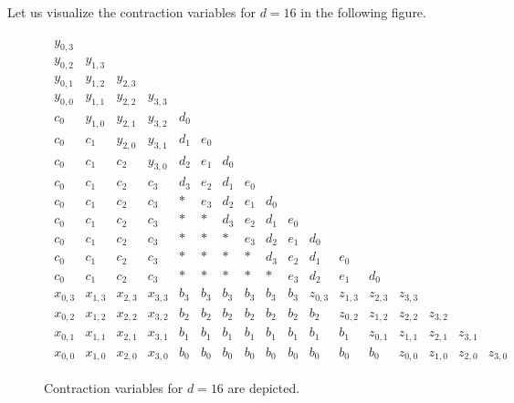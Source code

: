 Let us visualize the contraction variables for \( d = 16 \) in the following figure.

\begin{figure}[H]
    \begin{align*}
        \begin{array}{cccccccccccccccccccc}
            y_{0,3} & & & & & & & & & & & & \\
            y_{0,2} & y_{1,3} & & & & & & & & & & & \\
            y_{0,1} & y_{1,2} & y_{2,3} & & & & & & & & & & \\
            y_{0,0} & y_{1,1} & y_{2,2} & y_{3,3} & & & & & & & & & \\
            c_0 & y_{1,0} & y_{2,1} & y_{3,2} & d_0 & & & & & & & & \\
            c_0 & c_1 & y_{2,0} & y_{3,1} & d_1 & e_0 & & & & & & & \\
            c_0 & c_1 & c_2 & y_{3,0} & d_2 & e_1 & d_0 & & & & & & \\
            c_0 & c_1 & c_2 & c_3 & d_3 & e_2 & d_1 & e_0 & & & & & \\
            c_0 & c_1 & c_2 & c_3 &  *  & e_3 & d_2 & e_1 & d_0 & & & & \\
            c_0 & c_1 & c_2 & c_3 &  *  & * & d_3 & e_2 & d_1 & e_0 & & & \\
            c_0 & c_1 & c_2 & c_3 &  *  & * & * & e_3 & d_2 & e_1 & d_0 & & \\
            c_0 & c_1 & c_2 & c_3 &  *  & * & * & * & d_3 & e_2 & d_1 & e_0 & \\
            c_0 & c_1 & c_2 & c_3 &  *  & * & * & * & * & e_3 & d_2 & e_1 & d_0 \\
            x_{0,3} & x_{1,3} & x_{2,3} & x_{3,3} & b_3 & b_3 & b_3 & b_3 & b_3 & b_3 & z_{0,3} & z_{1,3} & z_{2,3} & z_{3,3} \\
            x_{0,2} & x_{1,2} & x_{2,2} & x_{3,2} & b_2 & b_2 & b_2 & b_2 & b_2 & b_2 & b_2 & z_{0,2} & z_{1,2} & z_{2,2} & z_{3,2} \\
            x_{0,1} & x_{1,1} & x_{2,1} & x_{3,1} & b_1 & b_1 & b_1 & b_1 & b_1 & b_1 & b_1 & b_1 & z_{0,1} & z_{1,1} & z_{2,1} & z_{3,1} \\
            x_{0,0} & x_{1,0} & x_{2,0} & x_{3,0} & b_0 & b_0 & b_0 & b_0 & b_0 & b_0 & b_0 & b_0 & b_0 & z_{0,0} & z_{1,0} & z_{2,0} & z_{3,0}
        \end{array}
    \end{align*}  
    \caption{Contraction variables for \( d = 16 \) are depicted.}
\end{figure}

